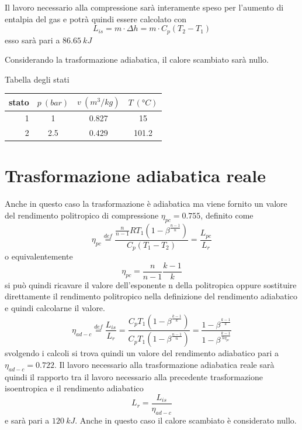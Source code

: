 \documentclass[a4paper,12pt]{article}
\begin{document}
Il lavoro necessario alla compressione sarà interamente speso per l'aumento di entalpia del gas
e potrà quindi essere calcolato con
\begin{equation}
    L_{is} = m\cdot \Delta h = m\cdot C_p (T_2 - T_1)
\end{equation}
esso sarà pari a $86.65\ kJ$

Considerando la trasformazione adiabatica, il calore scambiato sarà nullo.

Tabella degli stati

\begin{center}
    \begin{tabular}{r|c|c|c}
        stato    & $p\ (bar)$ & $v\ (m^3/kg)$ & $T\ (\text{°}C) $\\ \hline
        1   &           1 &          0.827    &           15     \\ \hline
        2   &         2.5 &          0.429    &           101.2
    \end{tabular}
\end{center}

\section{Trasformazione adiabatica reale}
\label{sec:seconda_trasformazione}
Anche in questo caso la trasformazione è adiabatica ma viene fornito un valore del rendimento
politropico di compressione $\eta_{pc} = 0.755$, definito come
\begin{equation}
    \label{eq:rendimento_politropica}
    \eta_{pc} \stackrel{def}{=} \frac{\displaystyle\frac{n}{n-1} R T_1 \left(1-\beta^{\displaystyle\frac{n-1}{n}} \right)}{C_p \left(T_1 - T_2\right)}
    = \frac{L_{pc}}{L_r}
\end{equation}
o equivalentemente 
\begin{equation}
    \label{eq:rendimento_politropica_breve}
    \eta_{pc} = \frac{n}{n-1} \frac{k-1}{k}
\end{equation}
si può quindi ricavare il valore dell'esponente n della politropica oppure sostituire direttamente
il rendimento politropico nella definizione del rendimento adiabatico e quindi calcolarne il valore.
\begin{equation}
    \label{eq:rendimento_compressione_adiabatico}
    \eta_{ad-c} \stackrel{def}{=} \frac{L_{is}}{L_r} = \frac{ C_p T_1 \left(1-\beta^{\displaystyle\frac{k-1}{k}}\right)}
    {C_p T_1 \left(1-\beta^{\displaystyle\frac{n-1}{n}}\right)} = \frac{1-\beta^{\displaystyle\frac{k-1}{k}}}{1-\beta^{\displaystyle\frac{k-1}{k\eta_{pc}}}}
\end{equation}
svolgendo i calcoli si trova quindi un valore del rendimento adiabatico pari a $\eta_{ad-c}=0.722$.
Il lavoro necessario alla trasformazione adiabatica reale sarà quindi il rapporto tra il lavoro necessario
alla precedente trasformazione isoentropica e il rendimento adiabatico
\begin{equation*}
    L_r = \frac{L_{is}}{\eta_{ad-c}}
\end{equation*}
e sarà pari a $120\ kJ$.
Anche in questo caso il calore scambiato è considerato nullo.
\end{document}
